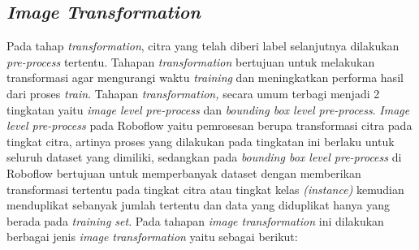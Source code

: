 \subsection{\textit{Image Transformation}}
\label{subsec:imagepreprocess}
Pada tahap \textit{transformation}, citra yang telah diberi label selanjutnya dilakukan \textit{pre-process} tertentu. Tahapan \textit{transformation} bertujuan untuk melakukan transformasi agar mengurangi waktu \textit{training} dan meningkatkan performa hasil dari proses \textit{train}. Tahapan \textit{transformation,} secara umum terbagi menjadi 2 tingkatan yaitu \textit{image level pre-process} dan \textit{bounding box level pre-process}. \textit{Image level pre-process} pada Roboflow yaitu pemrosesan berupa transformasi citra pada tingkat citra, artinya proses yang dilakukan pada tingkatan ini berlaku untuk seluruh dataset yang dimiliki, sedangkan pada \textit{bounding box level pre-process} di Roboflow bertujuan untuk memperbanyak dataset dengan memberikan transformasi tertentu pada tingkat citra atau tingkat kelas \textit{(instance)} kemudian menduplikat sebanyak jumlah tertentu dan data yang diduplikat hanya yang berada pada \textit{training set}. Pada tahapan \textit{image transformation} ini dilakukan berbagai jenis \textit{image transformation} yaitu sebagai berikut: \par

